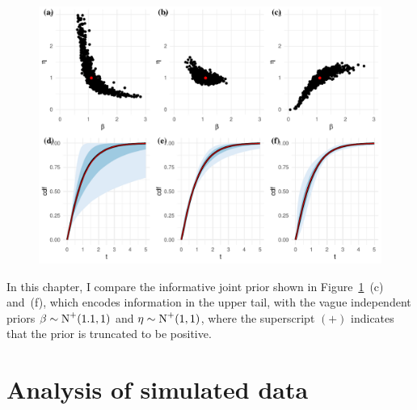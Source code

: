 \begin{figure}
    \centering
    \includegraphics[width=1\textwidth]{./figures/ch-2/joint-priors.pdf}
    \caption{}
    \label{fig:kaminskiy-join-priors}
\end{figure}

In this chapter, I compare the informative joint prior shown in Figure~\ref{fig:kaminskiy-join-priors}~(c) and~(f), which encodes information in the upper tail, with the vague independent priors $\beta \sim \hbox{N}^{+}(1.1, 1)$ and $\eta \sim \hbox{N}^{+}(1, 1)$, where the superscript $(+)$ indicates that the prior is truncated to be positive. 

\section{Analysis of simulated data} \label{sec:weibull-sim-example}


